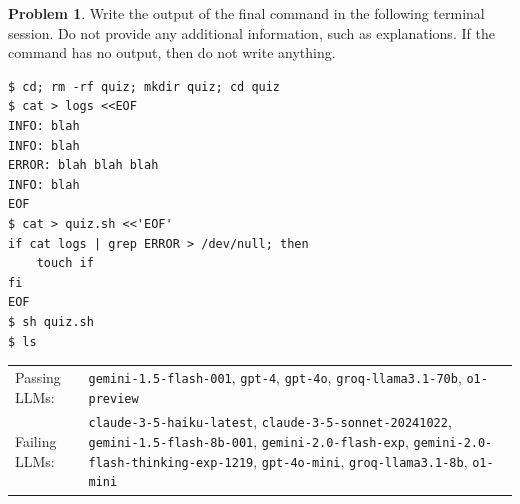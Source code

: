 \documentclass[10pt]{article}
\theoremstyle{definition}
\newtheorem{problem}{Problem}
\begin{document}
\noindent\vspace{0.1in}\begin{minipage}{\textwidth}

\begin{problem}
Write the output of the final command in the following terminal session.
Do not provide any additional information,
such as explanations.
If the command has no output,
then do not write anything.

\end{problem}
\begin{lstlisting}
$ cd; rm -rf quiz; mkdir quiz; cd quiz
$ cat > logs <<EOF
INFO: blah
INFO: blah
ERROR: blah blah blah
INFO: blah
EOF
$ cat > quiz.sh <<'EOF'
if cat logs | grep ERROR > /dev/null; then
    touch if
fi
EOF
$ sh quiz.sh
$ ls
\end{lstlisting}


\noindent
\begin{tabular}{p{1.0in}L{5in}}
Passing LLMs: & {\lstinline$gemini-1.5-flash-001$}, {\lstinline$gpt-4$}, {\lstinline$gpt-4o$}, {\lstinline$groq-llama3.1-70b$}, {\lstinline$o1-preview$} \\
Failing LLMs: & {\lstinline$claude-3-5-haiku-latest$}, {\lstinline$claude-3-5-sonnet-20241022$}, {\lstinline$gemini-1.5-flash-8b-001$}, {\lstinline$gemini-2.0-flash-exp$}, {\lstinline$gemini-2.0-flash-thinking-exp-1219$}, {\lstinline$gpt-4o-mini$}, {\lstinline$groq-llama3.1-8b$}, {\lstinline$o1-mini$} \\
\end{tabular}

\end{minipage}
\end{document}
